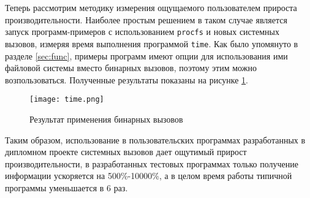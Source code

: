 Теперь рассмотрим методику измерения ощущаемого пользователем прироста
производительности. Наиболее простым решением в таком случае является запуск
программ-примеров с использованием \texttt{procfs} и новых системных вызовов,
измеряя время выполнения программой \texttt{time}. Как было упомянуто в разделе
\ref{sec:func}, примеры программ имеют опции для использования ими файловой
системы вместо бинарных вызовов, поэтому этим можно возпользоваться. Полученные
результаты показаны на рисунке \ref{fig:time}.

\begin{figure}
  \centering
  \texttt{[image: time.png]}
  \caption{Результат применения бинарных вызовов}
  \label{fig:time}
\end{figure}

Таким образом, использование в пользовательских программах разработанных в
дипломном проекте системных вызовов дает ощутимый прирост производительности, в
разработанных тестовых программах только получение информации ускоряется на
500\%-10000\%, а в целом время работы типичной программы уменьшается в 6 раз.
